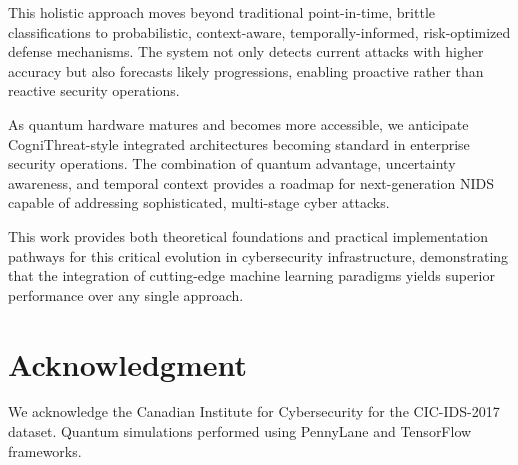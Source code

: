 \documentclass[conference]{IEEEtran}
\begin{document}
This holistic approach moves beyond traditional point-in-time, brittle classifications to probabilistic, context-aware, temporally-informed, risk-optimized defense mechanisms. The system not only detects current attacks with higher accuracy but also forecasts likely progressions, enabling proactive rather than reactive security operations.

As quantum hardware matures and becomes more accessible, we anticipate CogniThreat-style integrated architectures becoming standard in enterprise security operations. The combination of quantum advantage, uncertainty awareness, and temporal context provides a roadmap for next-generation NIDS capable of addressing sophisticated, multi-stage cyber attacks.

This work provides both theoretical foundations and practical implementation pathways for this critical evolution in cybersecurity infrastructure, demonstrating that the integration of cutting-edge machine learning paradigms yields superior performance over any single approach.

\section*{Acknowledgment}
We acknowledge the Canadian Institute for Cybersecurity for the CIC-IDS-2017 dataset. Quantum simulations performed using PennyLane and TensorFlow frameworks.
\end{document}
